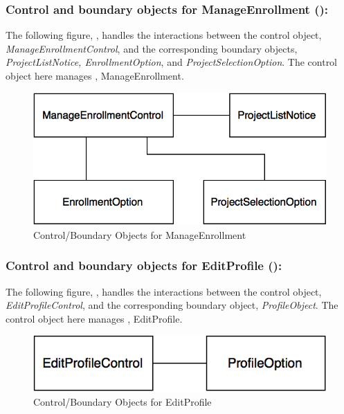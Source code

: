 \documentclass[12pt,letterpaper]{article}
\begin{document}
\newpage{}

\subsubsection*{Control and boundary objects for ManageEnrollment ():}

The following figure, , handles the interactions between the control object, {\it ManageEnrollmentControl}, and the corresponding boundary objects, {\it ProjectListNotice, EnrollmentOption}, and {\it ProjectSelectionOption}. The control object here manages , ManageEnrollment.

\vspace{1em}

\begin{figure}[H]
	\centering{}
	\includegraphics[scale=0.37]{imgs/cbod/manage-enrollment.png}
	\caption{Control/Boundary Objects for ManageEnrollment}
\end{figure}

\subsubsection*{Control and boundary objects for EditProfile ():}

The following figure, , handles the interactions between the control object, {\it EditProfileControl}, and the corresponding
boundary object, {\it ProfileObject}. The control object here manages , EditProfile.

\vspace{1em}

\begin{figure}[H]
	\centering{}
	\includegraphics[scale=0.37]{imgs/cbod/edit-profile.png}
	\caption{Control/Boundary Objects for EditProfile}
\end{figure}
\end{document}

